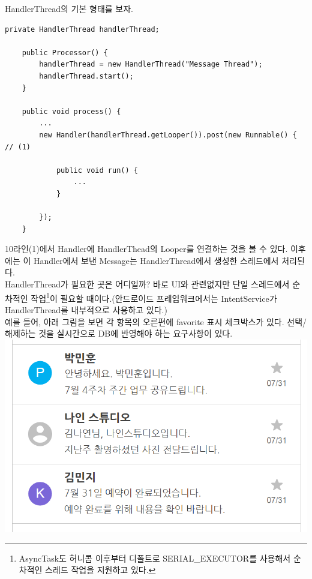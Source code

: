 HandlerThread의 기본 형태를 보자.
\begin{lstlisting}[frame=single] 
	private HandlerThread handlerThread;
	
	public Processor() {
		handlerThread = new HandlerThread("Message Thread");
		handlerThread.start();
	}
	
	public void process() {
		...
		new Handler(handlerThread.getLooper()).post(new Runnable() {  // (1)
		
			public void run() {
				...
			}
			
		});
	}
\end{lstlisting}
10라인(1)에서 Handler에 HandlerThead의 Looper를 연결하는 것을 볼 수 있다. 이후에는 이 Handler에서 보낸 Message는 HandlerThread에서 생성한 스레드에서 처리된다.\\

HandlerThread가 필요한 곳은 어디일까? 
바로 UI와 관련없지만 단일 스레드에서 순차적인 작업\footnote{AsyncTask도  허니콤 이후부터 디폴트로 SERIAL\_EXECUTOR를 사용해서 순차적인 스레드 작업을 지원하고 있다.}이 필요할 때이다.(안드로이드 프레임워크에서는 IntentService가 HandlerThread를 내부적으로 사용하고 있다.)\\

예를 들어, 아래 그림을 보면 각 항목의 오른편에 favorite 표시 체크박스가 있다.
선택/해제하는 것을 실시간으로 DB에 반영해야 하는 요구사항이 있다.\\
\includegraphics[scale=0.65]{favorite_sample}

